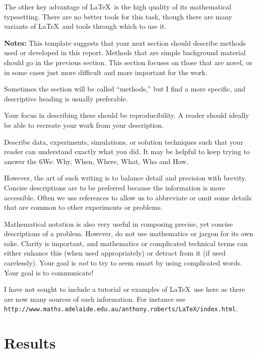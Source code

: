 \documentclass[12pt,a4paper]{article}
\begin{document}
The other key advantage of \LaTeX\ is the high quality of its
mathematical typesetting. There are no better tools for this task,
though there are many variants of \LaTeX\, and tools through which to
use it. 



\vspace{10mm}
\noindent \hrulefill

{\bf Notes:}
This template suggests that your next section should describe methods
used or developed in this report. Methods that are simple background
material should go in the previous section. This section focuses on
those that are novel, or in some cases just more difficult and more
important for the work.

Sometimes the section will be called ``methods,'' but I find a more
specific, and descriptive heading is usually preferable. 

Your focus in describing these should be reproducibility. A reader
should ideally be able to recreate your work from your description. 

Describe data, experiments, simulations, or solution techniques such
that your reader can understand exactly what you did.  It may be
helpful to keep trying to answer the 6Ws: Why, When, Where, What, Who
and How.

However, the art of such writing is to balance detail and precision
with brevity. Concise descriptions are to be preferred because the
information is more accessible. Often we use references to allow us to
abbreviate or omit some details that are common to other experiments
or problems.

Mathematical notation is also very useful in composing precise, yet
concise descriptions of a problem.  However, do not use mathematics or
jargon for its own sake. Clarity is important, and mathematics or
complicated technical terms can either enhance this (when used
appropriately) or detract from it (if used carelessly). Your goal is
{\em not} to try to seem smart by using complicated words. Your goal is to
communicate!

I have not sought to include a tutorial or examples of \LaTeX\ use
here as there are now many sources of such information. For instance
see {\footnotesize \verb|http://www.maths.adelaide.edu.au/anthony.roberts/LaTeX/index.html|.}


\clearpage
\section{Results}
\end{document}
